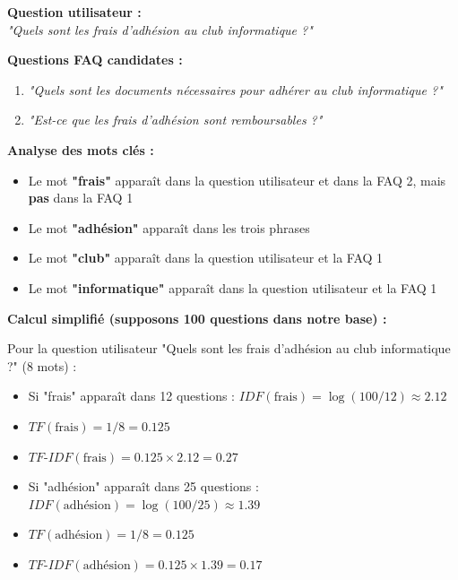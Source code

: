 \documentclass[11pt,a4paper]{article}
\begin{document}
\begin{exemple}
\textbf{Question utilisateur :} \\
\textit{"Quels sont les frais d'adhésion au club informatique ?"}

\vspace{0.3cm}
\textbf{Questions FAQ candidates :}
\begin{enumerate}
    \item \textit{"Quels sont les documents nécessaires pour adhérer au club informatique ?"}
    \item \textit{"Est-ce que les frais d'adhésion sont remboursables ?"}
\end{enumerate}

\vspace{0.3cm}
\textbf{Analyse des mots clés :}

\begin{itemize}
    \item Le mot \textbf{"frais"} apparaît dans la question utilisateur et dans la FAQ 2, mais \textbf{pas} dans la FAQ 1
    \item Le mot \textbf{"adhésion"} apparaît dans les trois phrases
    \item Le mot \textbf{"club"} apparaît dans la question utilisateur et la FAQ 1
    \item Le mot \textbf{"informatique"} apparaît dans la question utilisateur et la FAQ 1
\end{itemize}

\vspace{0.3cm}
\textbf{Calcul simplifié (supposons 100 questions dans notre base) :}

Pour la question utilisateur "Quels sont les frais d'adhésion au club informatique ?" (8 mots) :

\begin{itemize}
    \item Si "frais" apparaît dans 12 questions : $IDF(\text{frais}) = \log(100/12) \approx 2.12$
    \item $TF(\text{frais}) = 1/8 = 0.125$
    \item $TF\text{-}IDF(\text{frais}) = 0.125 \times 2.12 = 0.27$
\end{itemize}

\begin{itemize}
    \item Si "adhésion" apparaît dans 25 questions : $IDF(\text{adhésion}) = \log(100/25) \approx 1.39$
    \item $TF(\text{adhésion}) = 1/8 = 0.125$
    \item $TF\text{-}IDF(\text{adhésion}) = 0.125 \times 1.39 = 0.17$
\end{itemize}


\end{exemple}
\end{document}
